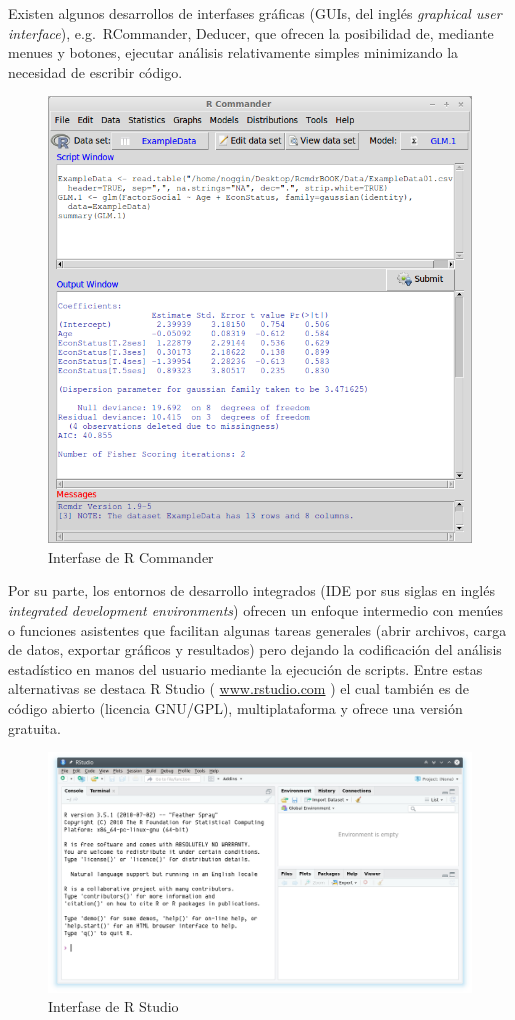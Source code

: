 \documentclass[a4paper]{book}
\begin{document}
Existen algunos desarrollos de interfases gráficas (GUIs, del inglés
\emph{graphical user interface}), e.g.~RCommander, Deducer, que ofrecen
la posibilidad de, mediante menues y botones, ejecutar análisis
relativamente simples minimizando la necesidad de escribir código.

\begin{figure}[h]

{\centering \includegraphics[width=0.75\linewidth,]{images/RcmdrBASE} 

}

\caption{Interfase de R Commander}\label{fig:unnamed-chunk-18}
\end{figure}

Por su parte, los entornos de desarrollo integrados (IDE por sus siglas
en inglés \emph{integrated development environments}) ofrecen un enfoque
intermedio con menúes o funciones asistentes que facilitan algunas
tareas generales (abrir archivos, carga de datos, exportar gráficos y
resultados) pero dejando la codificación del análisis estadístico en
manos del usuario mediante la ejecución de scripts. Entre estas
alternativas se destaca R Studio ( \url{www.rstudio.com} ) el cual
también es de código abierto (licencia GNU/GPL), multiplataforma y
ofrece una versión gratuita.

\begin{figure}[h]

{\centering \includegraphics[width=0.75\linewidth,]{images/RStudio} 

}

\caption{Interfase de R Studio}\label{fig:unnamed-chunk-19}
\end{figure}
\end{document}
